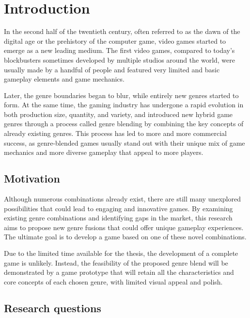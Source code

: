 \chapter{Introduction} \label{Chapter:Introduction}


In the second half of the twentieth century, often referred to as the dawn of the digital age or the prehistory of the computer game\cite{malliet2005history}, video games started to emerge as a new leading medium. The first video games, compared to today's blockbusters sometimes developed by multiple studios around the world, were usually made by a handful of people and featured very limited and basic gameplay elements and game mechanics. 


Later, the genre boundaries began to blur, while entirely new genres started to form. At the same time, the gaming industry has undergone a rapid evolution in both production size, quantity, and variety, and introduced new hybrid game genres through a process called genre blending\cite{arsenault2009} by combining the key concepts of already existing genres. This process has led to more and more commercial success, as genre-blended games usually stand out with their unique mix of game mechanics and more diverse gameplay that appeal to more players.



\section{Motivation}

Although numerous combinations already exist, there are still many unexplored possibilities that could lead to engaging and innovative games. By examining existing genre combinations and identifying gaps in the market, this research aims to propose new genre fusions that could offer unique gameplay experiences. The ultimate goal is to develop a game based on one of these novel combinations.

Due to the limited time available for the thesis, the development of a complete game is unlikely. Instead, the feasibility of the proposed genre blend will be demonstrated by a game prototype that will retain all the characteristics and core concepts of each chosen genre, with limited visual appeal and polish.



\section{Research questions}

